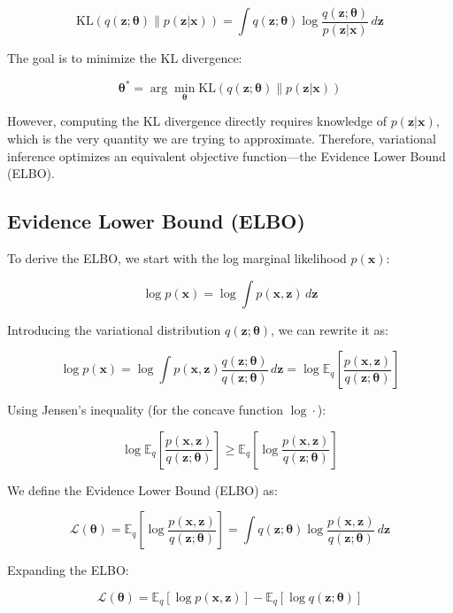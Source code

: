 \documentclass[10pt]{elegantbook}
\begin{document}
\[
\text{KL}(q(\mathbf{z}; \boldsymbol{\theta}) \| p(\mathbf{z} | \mathbf{x})) = \int q(\mathbf{z}; \boldsymbol{\theta}) \log \frac{q(\mathbf{z}; \boldsymbol{\theta})}{p(\mathbf{z} | \mathbf{x})} \, d\mathbf{z}
\]

The goal is to minimize the KL divergence:

\[
\boldsymbol{\theta}^* = \arg\min_{\boldsymbol{\theta}} \text{KL}(q(\mathbf{z}; \boldsymbol{\theta}) \| p(\mathbf{z} | \mathbf{x}))
\]

However, computing the KL divergence directly requires knowledge of \( p(\mathbf{z} | \mathbf{x}) \), which is the very quantity we are trying to approximate. Therefore, variational inference optimizes an equivalent objective function—the Evidence Lower Bound (ELBO).

\subsection{Evidence Lower Bound (ELBO)}

To derive the ELBO, we start with the log marginal likelihood \( p(\mathbf{x}) \):

\[
\log p(\mathbf{x}) = \log \int p(\mathbf{x}, \mathbf{z}) \, d\mathbf{z}
\]

Introducing the variational distribution \( q(\mathbf{z}; \boldsymbol{\theta}) \), we can rewrite it as:

\[
\log p(\mathbf{x}) = \log \int p(\mathbf{x}, \mathbf{z}) \frac{q(\mathbf{z}; \boldsymbol{\theta})}{q(\mathbf{z}; \boldsymbol{\theta})} \, d\mathbf{z} = \log \mathbb{E}_q \left[ \frac{p(\mathbf{x}, \mathbf{z})}{q(\mathbf{z}; \boldsymbol{\theta})} \right]
\]

Using Jensen’s inequality (for the concave function \( \log \cdot \)):

\[
\log \mathbb{E}_q \left[ \frac{p(\mathbf{x}, \mathbf{z})}{q(\mathbf{z}; \boldsymbol{\theta})} \right] \geq \mathbb{E}_q \left[ \log \frac{p(\mathbf{x}, \mathbf{z})}{q(\mathbf{z}; \boldsymbol{\theta})} \right]
\]

We define the Evidence Lower Bound (ELBO) as:

\[
\mathcal{L}(\boldsymbol{\theta}) = \mathbb{E}_q \left[ \log \frac{p(\mathbf{x}, \mathbf{z})}{q(\mathbf{z}; \boldsymbol{\theta})} \right] = \int q(\mathbf{z}; \boldsymbol{\theta}) \log \frac{p(\mathbf{x}, \mathbf{z})}{q(\mathbf{z}; \boldsymbol{\theta})} \, d\mathbf{z}
\]

Expanding the ELBO:

\[
\mathcal{L}(\boldsymbol{\theta}) = \mathbb{E}_q [\log p(\mathbf{x}, \mathbf{z})] - \mathbb{E}_q [\log q(\mathbf{z}; \boldsymbol{\theta})]
\]
\end{document}
